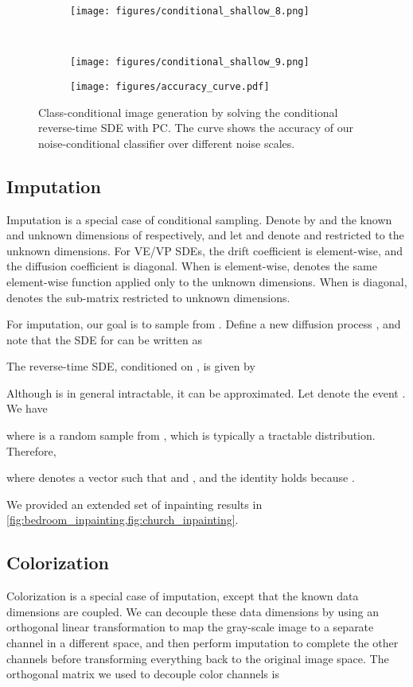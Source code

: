 \documentclass{article} \usepackage{iclr2021_conference,times}
\begin{document}
\begin{figure}
    \begin{subfigure}{0.32\textwidth}
        \texttt{[image: figures/conditional\_shallow\_8.png]}
    \end{subfigure}\\
    \begin{subfigure}{0.32\textwidth}
        \texttt{[image: figures/conditional\_shallow\_9.png]}
    \end{subfigure}
    \begin{subfigure}{0.4\textwidth}
        \texttt{[image: figures/accuracy\_curve.pdf]}
    \end{subfigure}
    \caption{Class-conditional image generation by solving the conditional reverse-time SDE with PC. The curve shows the accuracy of our noise-conditional classifier over different noise scales.}
    \label{fig:cond_sample_extend}
\end{figure}

\subsection{Imputation} \label{app:imputation}
Imputation is a special case of conditional sampling. Denote by  and  the known and unknown dimensions of  respectively, and let  and  denote  and  restricted to the unknown dimensions. For VE/VP SDEs, the drift coefficient  is element-wise, and the diffusion coefficient  is diagonal. When  is element-wise,  denotes the same element-wise function applied only to the unknown dimensions. When  is diagonal,  denotes the sub-matrix restricted to unknown dimensions. 

For imputation, our goal is to sample from . Define a new diffusion process , and note that the SDE for  can be written as

The reverse-time SDE, conditioned on , is given by

Although  is in general intractable, it can be approximated. Let  denote the event . We have

where  is a random sample from , which is typically a tractable distribution. Therefore,

where  denotes a vector  such that  and , and the identity holds because .

We provided an extended set of inpainting results in \cref{fig:bedroom_inpainting,fig:church_inpainting}.

\subsection{Colorization}\label{app:colorization}
Colorization is a special case of imputation, except that the known data dimensions are coupled. We can decouple these data dimensions by using an orthogonal linear transformation to map the gray-scale image to a separate channel in a different space, and then perform imputation to complete the other channels before transforming everything back to the original image space. The orthogonal matrix we used to decouple color channels is
\end{document}
